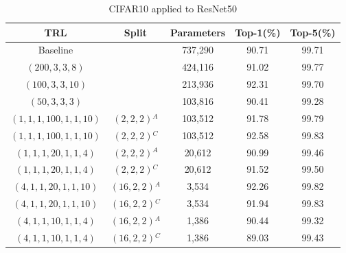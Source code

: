 \documentclass{article}
\begin{document}
\begin{table}
	\caption{CIFAR10 applied to ResNet50}
	\label{atab-2}
	\centering
	\begin{tabular}{c c c c c}
		\toprule
		\textbf{TRL} & \textbf{Split} & \textbf{Parameters} & \textbf{Top-1(\%)} & \textbf{Top-5(\%)} \\
		\midrule
		Baseline & & 737,290 & 90.71 & 99.71 \\
		$(200,3,3,8)$ & & 424,116 & 91.02 & 99.77 \\
		$(100,3,3,10)$ & & 213,936 & 92.31 & 99.70 \\
		$(50,3,3,3)$ & & 103,816 & 90.41 & 99.28 \\
		$(1,1,1,100,1,1,10)$ & $(2,2,2)$$^A$ & 103,512 & 91.78 & 99.79 \\
		$(1,1,1,100,1,1,10)$ & $(2,2,2)$$^C$ & 103,512 & 92.58 & 99.83 \\
		$(1,1,1,20,1,1,4)$ & $(2,2,2)$$^A$ & 20,612 & 90.99 & 99.46 \\
		$(1,1,1,20,1,1,4)$ & $(2,2,2)$$^C$ & 20,612 & 91.52 & 99.50 \\
		$(4,1,1,20,1,1,10)$ & $(16,2,2)$$^A$ & 3,534 & 92.26 & 99.82 \\
		$(4,1,1,20,1,1,10)$ & $(16,2,2)$$^C$ & 3,534 & 91.94 & 99.83 \\
		$(4,1,1,10,1,1,4)$ & $(16,2,2)$$^A$ & 1,386 & 90.44 & 99.32 \\
		$(4,1,1,10,1,1,4)$ & $(16,2,2)$$^C$ & 1,386 & 89.03 & 99.43 \\
		\hline
	\end{tabular}
\end{table}
\end{document}
